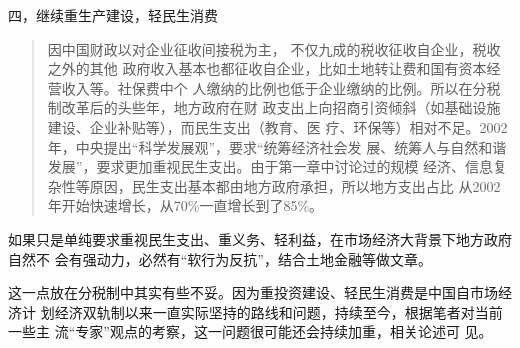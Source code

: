 {\heiti 四，继续重生产建设，轻民生消费}

\begin{quotation}
  因中国财政以对企业征收间接税为主， 不仅九成的税收征收自企业，税收之外的其他
  政府收入基本也都征收自企业，比如土地转让费和国有资本经营收入等。社保费中个
  人缴纳的比例也低于企业缴纳的比例。所以在分税制改革后的头些年，地方政府在财
  政支出上向招商引资倾斜（如基础设施建设、企业补贴等），而民生支出（教育、医
  疗、环保等）相对不足。2002年，中央提出“科学发展观”，要求“统筹经济社会发
  展、统筹人与自然和谐发展”，要求更加重视民生支出。由于第一章中讨论过的规模
  经济、信息复杂性等原因，民生支出基本都由地方政府承担，所以地方支出占比
  从2002年开始快速增长，从70\%一直增长到了85\%。\cite{zhishenshinei}
\end{quotation}
如果只是单纯要求重视民生支出、重义务、轻利益，在市场经济大背景下地方政府自然不
会有强动力，必然有“软行为反抗”，结合土地金融等做文章。

这一点放在分税制中其实有些不妥。因为重投资建设、轻民生消费是中国自市场经济计
划经济双轨制以来一直实际坚持的路线和问题，持续至今，根据笔者对当前一些主
流“专家”观点的考察，这一问题很可能还会持续加重，相关论述可
见。









